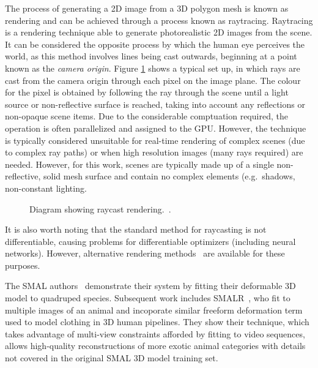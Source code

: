     \begin{definition}
        The process of generating a 2D image from a 3D polygon mesh is known as rendering and can be achieved through a process known as raytracing. Raytracing is a rendering technique able to generate photorealistic 2D images from the scene. It can be considered the opposite process by which the human eye perceives the world, as this method involves lines being cast outwards, beginning at a point known as the \emph{camera origin}. Figure \ref{fig:raycasting} shows a typical set up, in which rays are cast from the camera origin through each pixel on the image plane. The colour for the pixel is obtained by following the ray through the scene until a light source or non-reflective surface is reached, taking into account any reflections or non-opaque scene items. Due to the considerable comptuation required, the operation is often parallelized and assigned to the GPU. However, the technique is typically considered unsuitable for real-time rendering of complex scenes (due to complex ray paths) or when high resolution images (many rays required) are needed. However, for this work, scenes are typically made up of a single non-reflective, solid mesh surface and contain no complex elements (e.g.\ shadows, non-constant lighting.

        \begin{figure}[H] %
            \caption{Diagram showing raycast rendering.~\cite{rendering}.}
            \label{fig:raycasting}
        \end{figure}

        It is also worth noting that the standard method for raycasting is not differentiable, causing problems for differentiable optimizers (including neural networks). However, alternative rendering methods~\cite{loper2014opendr} are available for these purposes.
    \end{definition}

    The SMAL authors~\cite{zuffi2017menagerie} demonstrate their system by fitting their deformable 3D model to quadruped species. Subsequent work includes SMALR~\cite{zuffi_lions}, who fit to multiple images of an animal and incoporate similar freeform deformation term used to model clothing in 3D human pipelines. They show their technique, which takes advantage of multi-view constraints afforded by fitting to video sequences, allows high-quality reconstructions of more exotic animal categories with details not covered in the original SMAL 3D model training set. 
    
